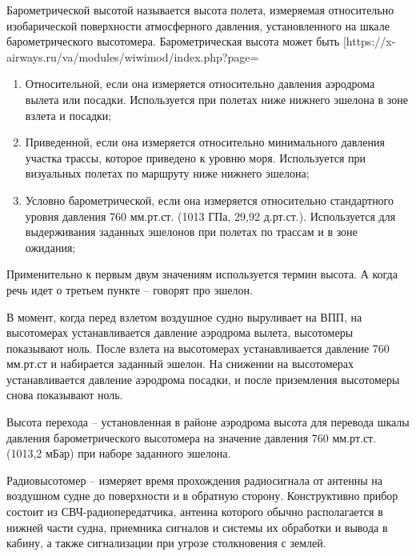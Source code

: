 \documentclass[nir, och, master]{SCWorks}
\begin{document}
Барометрической высотой называется высота полета, измеряемая относительно 
изобарической поверхности атмосферного давления, установленного на шкале 
барометрического высотомера. Барометрическая высота может быть 
[https://x-airways.ru/va/modules/wiwimod/index.php?page=%
\begin{enumerate}
	\item Относительной, если она измеряется относительно давления аэродрома вылета или посадки. 
	Используется при полетах ниже нижнего эшелона в зоне взлета и посадки;
	\item Приведенной, если она измеряется относительно минимального давления участка трассы, 
	которое приведено к уровню моря. Используется при визуальных полетах по маршруту ниже 
	нижнего эшелона;
	\item Условно барометрической, если она измеряется относительно стандартного уровня давления 
	760 мм.рт.ст. (1013 ГПа, 29,92 д.рт.ст.). Используется для выдерживания заданных эшелонов 
	при полетах по трассам и в зоне ожидания;
\end{enumerate}
 
Применительно к первым двум значениям используется термин высота. А когда речь идет о 
третьем пункте – говорят про эшелон.

В момент, когда перед взлетом воздушное судно выруливает на ВПП, на высотомерах 
устанавливается давление аэродрома вылета, высотомеры  показывают ноль. 
После взлета на высотомерах устанавливается давление 760 мм.рт.ст и 
набирается заданный эшелон. На снижении на высотомерах устанавливается 
давление аэродрома посадки, и после приземления высотомеры снова показывают ноль.

Высота перехода – установленная в районе аэродрома высота для перевода шкалы 
давления барометрического высотомера на значение давления 760 мм.рт.ст. (1013,2 мБар) 
при наборе заданного эшелона.

Радиовысотомер – измеряет время прохождения радиосигнала от антенны на 
воздушном судне до поверхности и в обратную сторону. Конструктивно прибор 
состоит из СВЧ-радиопередатчика, антенна которого обычно располагается в 
нижней части судна, приемника сигналов и системы их обработки и вывода в кабину, 
а также сигнализации при угрозе столкновения с землей.
\end{document}
